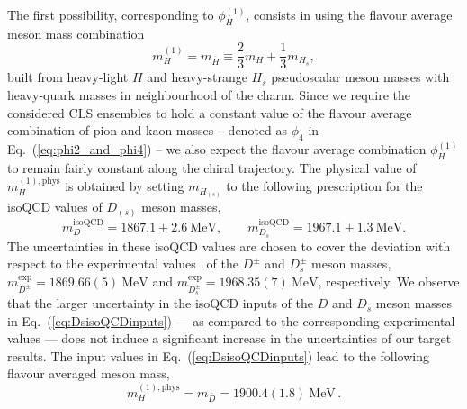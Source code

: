 The first possibility, corresponding to $\phi_H^{(1)}$, consists in using the flavour average meson mass combination
\begin{equation}
        m_H^{(1)} = m_{\overline{H}} \equiv \frac{2}{3} m_H + \frac{1}{3}m_{H_s},
        \label{eq:fl_av_matching}
\end{equation}
built from heavy-light $H$ and heavy-strange $H_s$ pseudoscalar meson masses with heavy-quark masses in neighbourhood of the charm.
%
Since we require the considered CLS ensembles to hold a constant value of the flavour average combination of pion and kaon masses -- denoted as $\phi_4$ in Eq.~(\ref{eq:phi2_and_phi4}) -- we also expect the flavour average combination  $\phi_H^{(1)}$ to remain fairly constant along the chiral trajectory. The physical value of $m_H^{(1), \mathrm{phys}}$ is obtained by setting $m_{H_{(s)}}$ to the following prescription for the isoQCD values of $D_{(s)}$ meson masses,
%
\begin{equation}
    m_D^{\mathrm{isoQCD}} = 1867.1 \pm 2.6  \ \mathrm{MeV}, \qquad m_{D_s}^{\mathrm{isoQCD}} = 1967.1 \pm 1.3 \ \mathrm{MeV}.
\label{eq:DsisoQCDinputs}
\end{equation}
%
  The uncertainties in these isoQCD values are chosen to cover the deviation with respect to the experimental values~\cite{ParticleDataGroup:2022pth} of the $D^{\pm}$ and $D_s^{\pm}$ meson masses, $m_{D^\pm}^{\mathrm{exp}} = 1869.66(5) \ \mathrm{MeV}$ and $m_{D_s^\pm}^{\mathrm{exp}} = 1968.35(7) \ \mathrm{MeV}$, respectively. We observe that the larger uncertainty in the isoQCD inputs of the $D$ and $D_s$ meson masses in Eq.~(\ref{eq:DsisoQCDinputs}) --- as compared to the corresponding experimental values --- does not induce a significant increase in the uncertainties of our target results. The input values in Eq.~(\ref{eq:DsisoQCDinputs}) lead to the following flavour averaged meson mass,
%
\begin{equation}
         m_H^{(1), \mathrm{phys}} = m_{\overline{D}} = 1900.4(1.8) \ \mathrm{MeV}\,.
\end{equation}
% 

